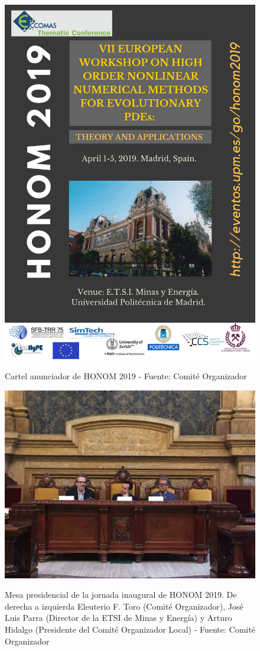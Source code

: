 \documentclass[twoside]{article}
\begin{document}
\begin{center}
\begin{figure}
	\centering
		\includegraphics[width=.85\textwidth]{Poster_HONOM2019}
	\label{fig:Cartel}
	\caption{Cartel anunciador de HONOM 2019  - Fuente: Comité Organizador}
\end{figure}
\end{center}
%
\begin{center}
\begin{figure}
	\centering
		\includegraphics[width=.95\textwidth]{Mesa}
	\label{fig:MesaP}
	\caption{Mesa presidencial de la jornada inaugural de HONOM 2019. De derecha a izquierda Eleuterio F. Toro (Comité Organizador), José Luis Parra (Director de la ETSI de Minas y Energía) y Arturo Hidalgo (Presidente del Comité Organizador Local) - Fuente: Comité Organizador}
\end{figure}
\end{center}
\end{document}
